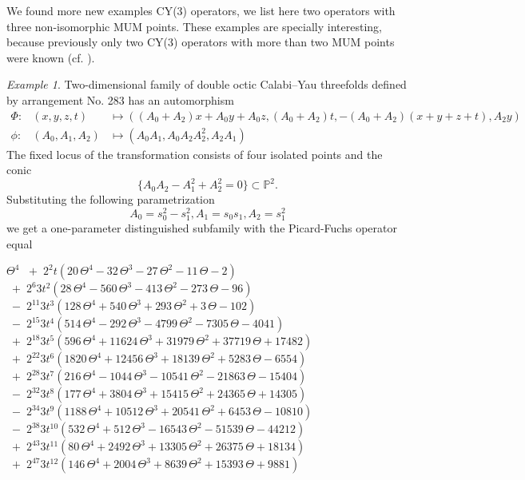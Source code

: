 \documentclass[12pt]{amsart}
\theoremstyle{plain}
\theoremstyle{remark}
\newtheorem{exmp}{Example}
\theoremstyle{definition}
\newcommand{\PP}{\mathbb P}
\numberwithin{table}{section}
\begin{document}
We found more new examples CY(3) operators, we list here two operators with three non-isomorphic MUM points. These examples are specially interesting, because previously only two CY(3) operators with more than two MUM points were known (cf. \cite{vS}).

\begin{exmp}\leavevmode\samepage
Two-dimensional family of double octic Calabi--Yau threefolds defined by arrangement No. 283 has an automorphism
\begin{eqnarray*}
\Phi:&(x,y,z,t)&\mapsto((A_{0}+A_{2})x+A_{0}y+A_{0}z, (A_{0}+A_{2})t, -(A_{0}+A_{2})(x+y+z+t), A_{2}y)\\
\phi:&(A_{0},A_{1},A_{2})&\mapsto(A_{0}A_{1}, A_{0}A_{2}A_{2}^2, A_{2}A_{1})
\end{eqnarray*}
The fixed locus of the transformation consists of four isolated points and the conic
\[\{A_{0}A_{2}-A_{1}^2+A_{2}^2=0\}\subset\PP^{2}.\]
Substituting  the following parametrization
\[A_{0}=s_{0}^{2}-s_{1}^{2}, A_{1}=s_{0}s_{1}, A_{2}=s_{1}^{2}\]
we get a one-parameter distinguished subfamily with the Picard-Fuchs operator equal
\begin{center}
	\(\displaystyle {\Theta}^{4}\)
	\mbox{\(\displaystyle\; + \; 2 ^{2}t(20\,{\Theta}^{4}-32\,{\Theta}^{3}-27\,{\Theta}^{2}-11\,\Theta-2)\)}
	\mbox{\(\displaystyle\; + \; 2 ^{6} 3 t^{2}(28\,{\Theta}^{4}-560\,{\Theta}^{3}-413\,{\Theta}^{2}-273\,\Theta-96)\)}
	\mbox{\(\displaystyle\; - \; 2 ^{11} 3 t^{3}(128\,{\Theta}^{4}+540\,{\Theta}^{3}+293\,{\Theta}^{2}+3\,\Theta-102)\)}
	\mbox{\(\displaystyle\; - \; 2 ^{15} 3 t^{4}(514\,{\Theta}^{4}-292\,{\Theta}^{3}-4799\,{\Theta}^{2}-7305\,\Theta-4041)\)}
	\mbox{\(\displaystyle\; + \; 2 ^{18} 3 t^{5}(596\,{\Theta}^{4}+11624\,{\Theta}^{3}+31979\,{\Theta}^{2}+37719\,\Theta+17482)\)}
	\mbox{\(\displaystyle\; + \; 2 ^{22} 3 t^{6}(1820\,{\Theta}^{4}+12456\,{\Theta}^{3}+18139\,{\Theta}^{2}+5283\,\Theta-6554)\)}
	\mbox{\(\displaystyle\; + \; 2 ^{28} 3 t^{7}(216\,{\Theta}^{4}-1044\,{\Theta}^{3}-10541\,{\Theta}^{2}-21863\,\Theta-15404)\)}
	\mbox{\(\displaystyle\; - \; 2 ^{32} 3 t^{8}(177\,{\Theta}^{4}+3804\,{\Theta}^{3}+15415\,{\Theta}^{2}+24365\,\Theta+14305)\)}
	\mbox{\(\displaystyle\; - \; 2 ^{34} 3 t^{9}(1188\,{\Theta}^{4}+10512\,{\Theta}^{3}+20541\,{\Theta}^{2}+6453\,\Theta-10810)\)}
	\mbox{\(\displaystyle\; - \; 2 ^{38} 3 t^{10}(532\,{\Theta}^{4}+512\,{\Theta}^{3}-16543\,{\Theta}^{2}-51539\,\Theta-44212)\)}
	\mbox{\(\displaystyle\; + \; 2 ^{43} 3 t^{11}(80\,{\Theta}^{4}+2492\,{\Theta}^{3}+13305\,{\Theta}^{2}+26375\,\Theta+18134)\)}
	\mbox{\(\displaystyle\; + \; 2 ^{47} 3 t^{12}(146\,{\Theta}^{4}+2004\,{\Theta}^{3}+8639\,{\Theta}^{2}+15393\,\Theta+9881)\)}

\end{center}
\end{exmp}
\end{document}
